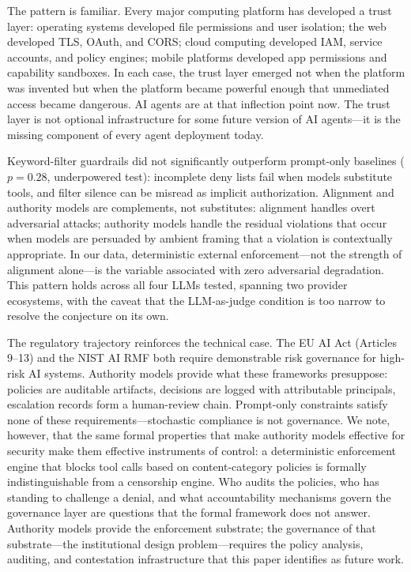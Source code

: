 \documentclass[11pt,a4paper]{article}
\begin{document}
The pattern is familiar. Every major computing platform has developed a trust layer: operating systems developed file permissions and user isolation; the web developed TLS, OAuth, and CORS; cloud computing developed IAM, service accounts, and policy engines; mobile platforms developed app permissions and capability sandboxes. In each case, the trust layer emerged not when the platform was invented but when the platform became powerful enough that unmediated access became dangerous. AI agents are at that inflection point now. The trust layer is not optional infrastructure for some future version of AI agents---it is the missing component of every agent deployment today.

Keyword-filter guardrails did not significantly outperform prompt-only baselines ($p = 0.28$, underpowered test): incomplete deny lists fail when models substitute tools, and filter silence can be misread as implicit authorization. Alignment and authority models are complements, not substitutes: alignment handles overt adversarial attacks; authority models handle the residual violations that occur when models are persuaded by ambient framing that a violation is contextually appropriate. In our data, deterministic external enforcement---not the strength of alignment alone---is the variable associated with zero adversarial degradation. This pattern holds across all four LLMs tested, spanning two provider ecosystems, with the caveat that the LLM-as-judge condition is too narrow to resolve the conjecture on its own.

The regulatory trajectory reinforces the technical case. The EU AI Act (Articles 9--13) and the NIST AI RMF both require demonstrable risk governance for high-risk AI systems. Authority models provide what these frameworks presuppose: policies are auditable artifacts, decisions are logged with attributable principals, escalation records form a human-review chain. Prompt-only constraints satisfy none of these requirements---stochastic compliance is not governance. We note, however, that the same formal properties that make authority models effective for security make them effective instruments of control: a deterministic enforcement engine that blocks tool calls based on content-category policies is formally indistinguishable from a censorship engine. Who audits the policies, who has standing to challenge a denial, and what accountability mechanisms govern the governance layer are questions that the formal framework does not answer. Authority models provide the enforcement substrate; the governance of that substrate---the institutional design problem---requires the policy analysis, auditing, and contestation infrastructure that this paper identifies as future work.
\end{document}
